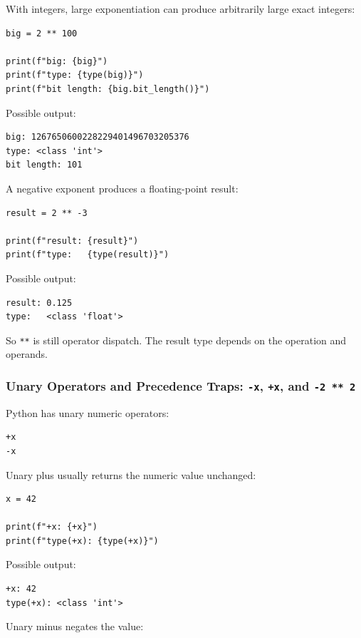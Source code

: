 With integers, large exponentiation can produce arbitrarily large exact integers:

\begin{verbatim}
big = 2 ** 100

print(f"big: {big}")
print(f"type: {type(big)}")
print(f"bit length: {big.bit_length()}")
\end{verbatim}

Possible output:

\begin{verbatim}
big: 1267650600228229401496703205376
type: <class 'int'>
bit length: 101
\end{verbatim}

A negative exponent produces a floating-point result:

\begin{verbatim}
result = 2 ** -3

print(f"result: {result}")
print(f"type:   {type(result)}")
\end{verbatim}

Possible output:

\begin{verbatim}
result: 0.125
type:   <class 'float'>
\end{verbatim}

So \texttt{**} is still operator dispatch. The result type depends on the operation and operands.

\subsubsection{Unary Operators and Precedence Traps: \texttt{-x}, \texttt{+x}, and \texttt{-2 ** 2}}

Python has unary numeric operators:

\begin{verbatim}
+x
-x
\end{verbatim}

Unary plus usually returns the numeric value unchanged:

\begin{verbatim}
x = 42

print(f"+x: {+x}")
print(f"type(+x): {type(+x)}")
\end{verbatim}

Possible output:

\begin{verbatim}
+x: 42
type(+x): <class 'int'>
\end{verbatim}

Unary minus negates the value:

